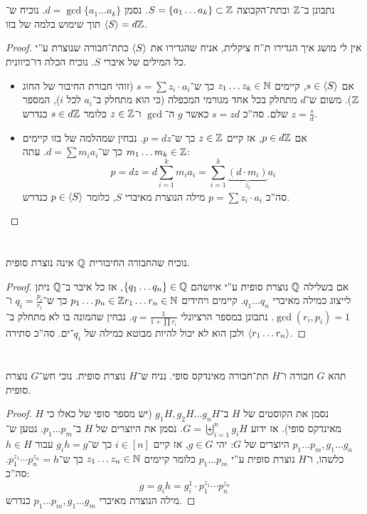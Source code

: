 \documentclass[]{../../../../../tex/classes/homework}
\begin{document}
	\section{}
	נתבונן ב־$\mathbb{Z}$ ובתת־הקבוצה $S = \{a_1 \dots a_k\} \subset \mathbb{Z}$. נסמן $d = \gcd\{a_1 \dots a_k\}$. נוכיח ש־$\langle S \rangle = d\mathbb{Z}$ תוך שימוש בלמה של בזו. 
	\begin{proof}
		אין לי מושג איך הגדירו ת''ח ציקלית, אניח שהגדירו את $\langle S \rangle$ כתת־חבורה שנוצרת ע''י כל המילים של איברי $S$. נוכיח הכלה דו־כיוונית. 
		\begin{itemize}
			\item[$\subset$] אם $s \in \langle S \rangle$, קיימים $z_1 \dots z_k \in \mathbb{N}$ כך ש־$s = \sum z_i \cdot a_i$ (זוהי חבורת החיבור של החוג $\mathbb{Z}$). משום ש־$d$ מתחלק בכל אחד מגורמי המכפלה (כי הוא מתחלק ב־$a_i$ לכל $i$), המספר $z = \frac{s}{d}$ שלם. סה''כ $s = zd$ כאשר $g$ ה־$\gcd$ ו־$z \in \mathbb{Z}$ כלומר $s \in d\mathbb{Z}$ כנדרש. 
			\item[$\supset$] אם $p \in d\mathbb{Z}$, אז קיים $z \in \mathbb{Z}$ כך ש־$p = dz$. נבחין שמהלמה של בזו קיימים $m_1 \dots m_k \in \mathbb{Z}$ כך ש־$d = \sum m_ia_i$. עתה: 
			\[ p = dz = d\sum_{i = 1}^{k}m_i a_i = \sum_{i = 1}^{k}\underbrace{(d \cdot m_i)}_{z_i}a_i \]
			סה''כ $p = \sum z_i \cdot a_i$ מילה הנוצרת מאיברי $S$, כלומר $p \in \langle S \rangle$ כנדרש. 
		\end{itemize}
	\end{proof}
	
	\section{}
	נוכיח שהחבורה החיבורית $\mathbb{Q}$ אינה נוצרת סופית. 
	\begin{proof}
		אם בשלילה $\mathbb{Q}$ נוצרת סופית ע''י איזשהם $\{q_1 \dots q_n\} \in \mathbb{Q}$, אז כל איבר ב־$\mathbb{Q}$ ניתן לייצוג כמילה מאיברי $q_1 \dots q_n$. קיימים ויחידים $p_1 \dots p_n \in \mathbb{Z} r_1 \dots r_n \in \mathbb{N}$ כך ש־$q_i = \frac{p_i}{r_i}$ ו־$\gcd(r_i, p_i) =1$. נתבונן במספר הרציונלי $q = \frac{1}{1 + \prod r_i}$. נבחין שהמונה בו לא מתחלק ב־$\langle r_1 \dots r_n\rangle$ ולכן הוא לא יכול להיות מבוטא כמילה של $q_i$־ים. סה''כ סתירה. 
	\end{proof}
	
	\section{}
	תהא $G$ חבורה ו־$H$ תת־חבורה מאינדקס סופי. נניח ש־$H$ נוצרת סופית. נוכי חש־$G$ נוצרת סופית. 
	
	\begin{proof}
		נסמן את הקוסטים של $H$ ב־$g_1H, g_2H \dots g_nH$ (יש מספר סופי של כאלו כי $H$ מאינדקס סופי). אז ידוע $G = \biguplus_{i =1}^{n} g_iH$. נסמן את היוצרים של $H$ ב־$p_1 \dots p_m$. נטען ש־$p_1 \dots p_m, g_1 \dots g_n$ היוצרים של $G$: יהי $g \in G$, אז קיים $i \in [n]$ כך ש־$g_i h = g$ עבור $h \in H$ כלשהו, ו־$H$ נוצרת סופית ע''י $p_1 \dots p_m$ כלומר קיימים $z_1 \dots z_n \in \mathbb{N}$ כך ש־$p_1^{z_1} \cdots p_n^{z_n} = h$. סה''כ: 
		\[ g = g_i h = g_i^{1} \cdot p_1^{z_1} \cdots p_n^{z_n} \]
		מילה הנוצרת מאיברי $p_1 \dots p_m, g_1 \dots g_m$ כנדרש. 
	\end{proof}
	
	
	\ndoc
\end{document}
